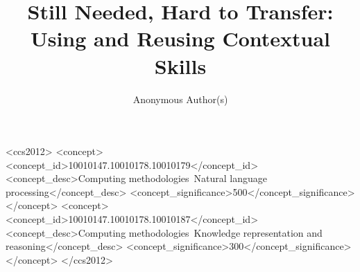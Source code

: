 \documentclass[sigconf, anonymous, review]{acmart}
\begin{document}
\title{Still Needed, Hard to Transfer: Using and Reusing Contextual Skills}

\author{Anonymous Author(s)}



\begin{CCSXML}
<ccs2012>
   <concept>
       <concept_id>10010147.10010178.10010179</concept_id>
       <concept_desc>Computing methodologies~Natural language processing</concept_desc>
       <concept_significance>500</concept_significance>
       </concept>
   <concept>
       <concept_id>10010147.10010178.10010187</concept_id>
       <concept_desc>Computing methodologies~Knowledge representation and reasoning</concept_desc>
       <concept_significance>300</concept_significance>
       </concept>
</ccs2012>
\end{CCSXML}


\maketitle







\label{endmain}




\appendix


\end{document}
